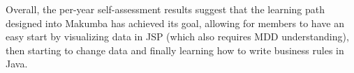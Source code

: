 \documentclass{llncs}
\begin{document}
Overall, the per-year self-assessment results suggest that the learning path designed into Makumba has achieved its goal, allowing for members to have an easy start by visualizing data in JSP (which also requires MDD understanding), then starting to change data and finally learning how to write business rules in Java.








%
\end{document}
